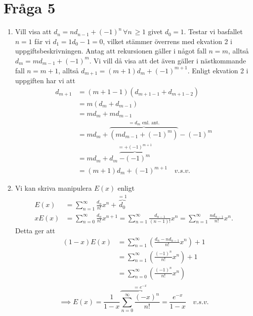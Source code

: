 \documentclass{article}
\begin{document}
\section{Fråga 5}
\begin{enumerate}[label=(\roman*)]
	\item
		Vill visa att $d_n = nd_{n-1} + \left( -1 \right)^{n} \, \forall n \, \geq 1$ givet $d_0 = 1$. Testar vi basfallet $n = 1$ får vi $d_1 = 1d_0 - 1 = 0$, vilket stämmer överrens med ekvation 2 i uppgiftsbeskrivningen. Antag att rekursionen gäller i något fall $n = m$, alltså $d_m = md_{m-1} + (-1)^{m}$. Vi vill då visa att det även gäller i nästkommande fall $n = m + 1$, alltså $d_{m+1} = (m+1)d_{m} + (-1)^{m+1}$. Enligt ekvation 2 i uppgiften har vi att
		\begin{equation*}
			\begin{aligned}
				d_{m+1} &= (m+1-1)(d_{m+1-1} + d_{m+1-2}) \\
					&= m(d_{m} + d_{m-1}) \\
					&= m d_m + m d_{m-1}\\
					&= m d_m + \overbrace{\left(m d_{m-1} + (-1)^{m}\right)}^\text{$=d_m$ enl. ant.} - (-1)^{m}\\
					&= m d_m + d_m \overbrace{- (-1)^{m}}^\text{$=+(-1)^{m+1}$}\\
					&= (m+1)d_m + (-1)^{m+1} \quad v.s.v.
			\end{aligned}
		\end{equation*}
	\item
		Vi kan skriva manipulera $E(x)$ enligt
		\begin{align*}
			E(x) &= \sum\limits_{n=1}^{\infty} \frac{d_n}{n!} x^{n} + \overbrace{d_0}^\text{$=1$}\\
			x E(x) &= \sum\limits_{n=0}^{\infty} \frac{d_n}{n!} x^{n+1} = \sum\limits_{n=1}^{\infty} \frac{d_{n-1}}{(n-1)!} x^{n} = \sum\limits_{n=1}^{\infty} \frac{nd_{n-1}}{n!} x^{n}.
		\end{align*}
		Detta ger att
		\begin{align*}
			(1-x)E(x) &= \sum\limits_{n=1}^{\infty} \left( \frac{d_n - n d_{n-1}}{n!} x^{n} \right)  + 1\\
				  &= \sum\limits_{n=1}^{\infty} \left( \frac{(-1)^{n}}{n!} x^{n} \right) + 1\\
				  &= \sum\limits_{n=0}^{\infty} \left( \frac{(-1)^{n}}{n!} x^{n} \right) \\
		\end{align*}
		\[
			\implies E(x) = \frac{1}{1-x} \overbrace{\sum\limits_{n=0}^{\infty} \frac{(-x)^{n}}{n!}}^\text{$=e^{-x}$} = \frac{e^{-x}}{1-x} \quad v.s.v.
\]
\end{enumerate}
\end{document}
